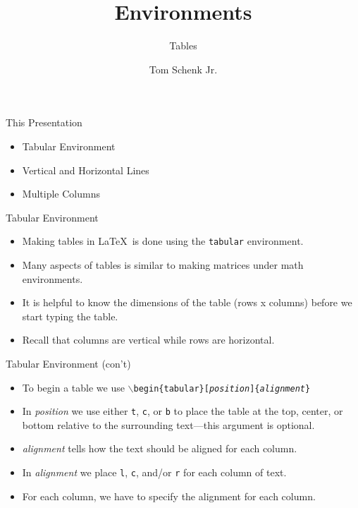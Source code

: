 \documentclass[pdf]{prosper}
\title{Environments}
\subtitle{Tables}
\author{Tom Schenk Jr.}		%
\begin{document}
\maketitle
\begin{slide}{This Presentation}
	\begin{itemize}
		\item Tabular Environment
		\item Vertical and Horizontal Lines
		\item Multiple Columns
	\end{itemize}
\end{slide}
\begin{slide}{Tabular Environment}
	\begin{itemize}
		\item Making tables in \LaTeX\ is done using the \texttt{tabular} environment.
		\item Many aspects of tables is similar to making matrices under math environments.
		\item It is helpful to know the dimensions of the table (rows x columns) before we start typing the table.
		\item Recall that columns are vertical while rows are horizontal.
	\end{itemize}
\end{slide}
\begin{slide}{Tabular Environment (con't)}
	\begin{itemize}
		\item To begin a table we use \texttt{$\backslash$begin\{tabular\}[\textit{position}]\{\textit{alignment}\}}
		\item In \textit{position} we use either \texttt{t}, \texttt{c}, or \texttt{b} to place the table at the top, center, or bottom relative to the surrounding text---this argument is optional.
		\item \textit{alignment} tells how the text should be aligned for each column.
		\item In \textit{alignment} we place \texttt{l}, \texttt{c}, and/or \texttt{r} for each column of text.
		\item For each column, we have to specify the alignment for each column.
	\end{itemize}
\end{slide}
\end{document}

